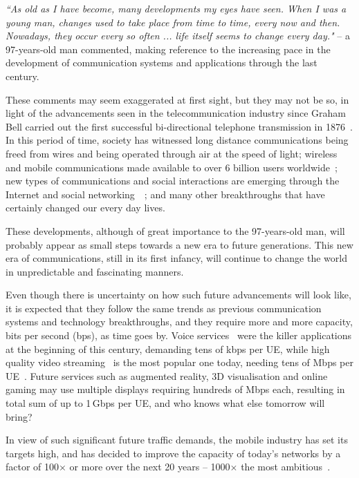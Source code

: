 \documentclass{IEEEtran}
\begin{document}
\emph{``As old as I have become,
many developments my eyes have seen.
When I was a young man,
changes used to take place from time to time,
every now and then.
Nowadays, they occur every so often ...
life itself seems to change every day."}
-- a 97-years-old man commented,
making reference to the increasing pace in the development of communication systems and applications through the last century.


These comments may seem exaggerated at first sight,
but they may not be so,
in light of the advancements seen in the telecommunication industry
since Graham Bell carried out the first successful bi-directional telephone transmission in 1876~\cite{GrahamBell}.
In this period of time,
society has witnessed long distance communications being freed from wires
and being operated through air at the speed of light;
wireless and mobile communications made available to over 6 billion users worldwide~\cite{MobiForge2014};
new types of communications and social interactions are emerging through the Internet and social networking~\cite{WWW}~\cite{SocialNetworks2013};
and many other breakthroughs that have certainly changed our every day lives.

These developments,
although of great importance to the 97-years-old man,
will probably appear as small steps towards a new era to future generations.
This new era of communications,
still in its first infancy,
will continue to change the world in unpredictable and fascinating manners.

Even though there is uncertainty on how such future advancements will look like,
it is expected that they follow the same trends as previous communication systems and technology breakthroughs,
and they require more and more capacity, bits per second (bps),
as time goes by.
Voice services~\cite{GSM} were the killer applications at the beginning of this century,
demanding tens of kbps per \ac{UE},
while high quality video streaming~\cite{Wu01streamingvideo} is the most popular one today,
needing tens of Mbps per \ac{UE}~\cite{1497859}.
Future services such as augmented reality, 3D visualisation and online gaming may use multiple displays requiring hundreds of Mbps each,
resulting in total sum of up to 1\,Gbps per \ac{UE},
and who knows what else tomorrow will bring?

\bigskip

In view of such significant future traffic demands,
the mobile industry has set its targets high,
and has decided to improve the capacity of today's networks
by a factor of 100$\times$ or more over the next 20 years
-- 1000$\times$ the most ambitious~\cite{qualcom2012}.
\end{document}
